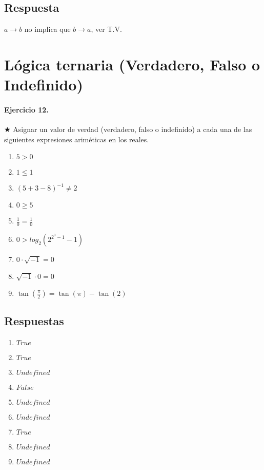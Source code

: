 \documentclass[a4paper]{article}
\begin{document}
\subsection*{Respuesta}

$a\rightarrow b$ no implica que $b\rightarrow a$, ver T.V.

\section{Lógica ternaria (Verdadero, Falso o Indefinido)}

\paragraph{\textbf{Ejercicio 12.}} $\bigstar$ Asignar un valor de verdad (verdadero, falso o indefinido) a cada una de las siguientes expresiones ariméticas en los reales.

\begin{multicols}{3}
\begin{enumerate}[label=\alph*)]
\item $5>0$
\item $1\leq 1$
\item $(5+3-8)^{-1}\neq 2$
\item $0 \geq 5$
\item $\frac{1}{0} = \frac{1}{0}$
\item $0 > log_2(2^{2^0-1}-1)$
\item $0\cdot \sqrt{-1}=0$
\item $\sqrt{-1} \cdot 0=0$
\item $ \tan (\frac{\pi}{2})=\tan (\pi) - \tan (2)$
\end{enumerate}
\end{multicols}

\subsection*{Respuestas}

\begin{multicols}{3}
\begin{enumerate}[label=\alph*)]
\item $True$
\item $True$
\item $Undefined$
\item $False$
\item $Undefined$
\item $Undefined$
\item $True$
\item $Undefined$
\item $Undefined$
\end{enumerate}
\end{multicols}
\end{document}

